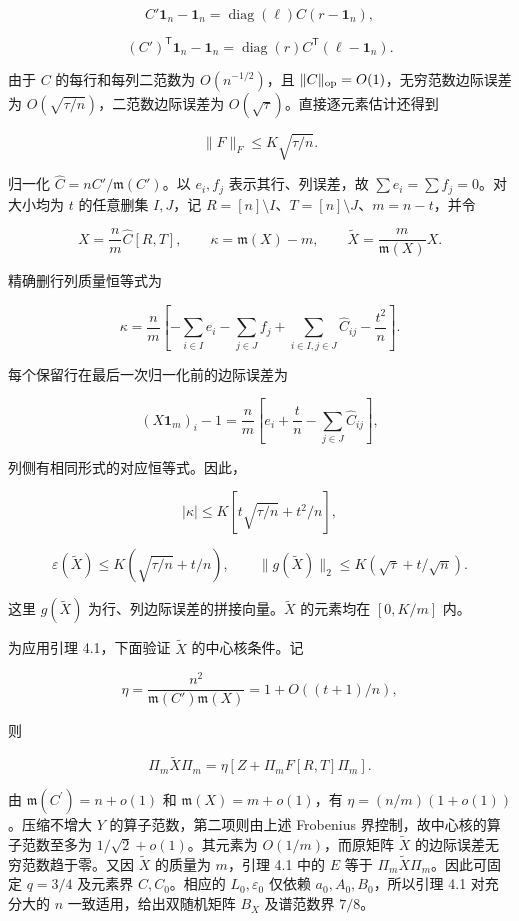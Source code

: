 \documentclass[11pt,a4paper]{article}
\begin{document}
\[C'\mathbf 1_n-\mathbf 1_n=\operatorname{diag}(\ell)C(r-\mathbf 1_n),\]

\[(C')^{\mathsf T}\mathbf 1_n-\mathbf 1_n=\operatorname{diag}(r)C^{\mathsf T}(\ell-\mathbf 1_n).\]

由于 \(C\) 的每行和每列二范数为 \(O(n^{-1/2})\)，且 \(\|C\|_{\rm op}=O(1)\)，无穷范数边际误差为 \(O(\sqrt{\tau/n})\)，二范数边际误差为 \(O(\sqrt\tau)\)。直接逐元素估计还得到

\[\|F\|_F\le K\sqrt{\tau/n}.\]

归一化 \(\widehat C=nC'/\mathfrak m(C')\)。以 \(e_i,f_j\) 表示其行、列误差，故 \(\sum e_i=\sum f_j=0\)。对大小均为 \(t\) 的任意删集 \(I,J\)，记 \(R=[n]\setminus I\)、\(T=[n]\setminus J\)、\(m=n-t\)，并令

\[X=\frac n m\widehat C[R,T],\qquad \kappa=\mathfrak m(X)-m,\qquad \widetilde X=\frac m{\mathfrak m(X)}X.\]

精确删行列质量恒等式为


\begin{equation}
\kappa=\frac n m\left[-\sum_{i\in I}e_i-\sum_{j\in J}f_j+\sum_{i\in I,j\in J}\widehat C_{ij}-\frac{t^2}{n}\right].
\tag{4.1}
\label{eq-deletion-mass}
\end{equation}

每个保留行在最后一次归一化前的边际误差为

\[(X\mathbf 1_m)_i-1=\frac n m\left[e_i+\frac t n-\sum_{j\in J}\widehat C_{ij}\right],\]

列侧有相同形式的对应恒等式。因此，

\[|\kappa|\le K\left[t\sqrt{\tau/n}+t^2/n\right],\]

\[\varepsilon(\widetilde X)\le K(\sqrt{\tau/n}+t/n),\qquad \|g(\widetilde X)\|_2\le K(\sqrt\tau+t/\sqrt n).\]

这里 \(g(\widetilde X)\) 为行、列边际误差的拼接向量。\(\widetilde X\) 的元素均在 \([0,K/m]\) 内。

为应用引理 4.1，下面验证 \(\widetilde X\) 的中心核条件。记

\[\eta=\frac{n^2}{\mathfrak m(C')\mathfrak m(X)}=1+O((t+1)/n),\]

则

\[\Pi_m\widetilde X\Pi_m=\eta\left[Z+\Pi_mF[R,T]\Pi_m\right].\]

由 \(\mathfrak m(C^{\prime})=n+o(1)\) 和 \(\mathfrak m(X)=m+o(1)\)，有 \(\eta=(n/m)(1+o(1))\)。压缩不增大 \(Y\) 的算子范数，第二项则由上述 Frobenius 界控制，故中心核的算子范数至多为 \(1/\sqrt2+o(1)\)。其元素为 \(O(1/m)\)，而原矩阵 \(\widetilde X\) 的边际误差无穷范数趋于零。又因 \(\widetilde X\) 的质量为 \(m\)，引理 4.1 中的 \(E\) 等于 \(\Pi_m\widetilde X\Pi_m\)。因此可固定 \(q=3/4\) 及元素界 \(C,C_0\)。相应的 \(L_0,\varepsilon_0\) 仅依赖 \(a_0,A_0,B_0\)，所以引理 4.1 对充分大的 \(n\) 一致适用，给出双随机矩阵 \(B_X\) 及谱范数界 \(7/8\)。
\end{document}

